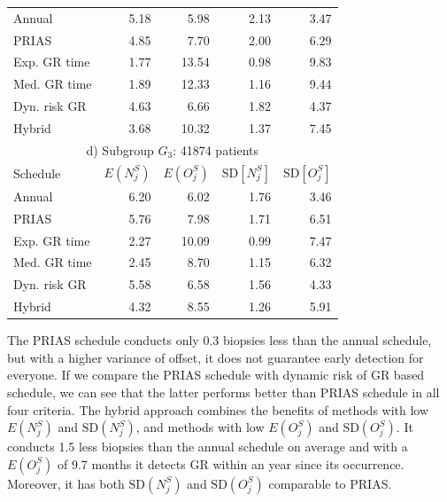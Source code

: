 \begin{table}
\begin{tabular}{lrrrr}
\hline
Annual         & 5.18            & 5.98                & 2.13          & 3.47              \\
PRIAS          & 4.85            & 7.70                & 2.00          & 6.29        \\
Exp. GR time & 1.77            & 13.54               & 0.98          & 9.83              \\
Med. GR time & 1.89             & 12.33               & 1.16          & 9.44              \\
Dyn. risk GR       & 4.63            & 6.66                & 1.82          & 4.37              \\
Hybrid       & 3.68            & 10.32                & 1.37          & 7.45              \\
\hline      
\multicolumn{5}{c}{d) Subgroup $G_3$: 41874 patients}\\
\hline
Schedule        & $E(N^S_j)$ & $E(O^S_j)$ & ${\mbox{SD}[N^S_j]}$ & ${\mbox{SD}[O^S_j]}$ \\
\hline
Annual         & 6.20             & 6.02                & 1.76          & 3.46              \\
PRIAS          & 5.76             & 7.98                & 1.71         & 6.51        \\
Exp. GR time & 2.27            & 10.09               & 0.99          & 7.47              \\
Med. GR time & 2.45            & 8.70                & 1.15          & 6.32              \\
Dyn. risk GR       & 5.58            & 6.58                & 1.56          & 4.33              \\
Hybrid       & 4.32            & 8.55                & 1.26          & 5.91              \\
\hline     
\end{tabular}
\end{table}

The PRIAS schedule conducts only 0.3 biopsies less than the annual schedule, but with a higher variance of offset, it does not guarantee early detection for everyone. If we compare the PRIAS schedule with dynamic risk of GR based schedule, we can see that the latter performs better than PRIAS schedule in all four criteria. The hybrid approach combines the benefits of methods with low $E(N^S_j)$ and $\mbox{SD}(N^S_j)$, and methods with low $E(O^S_j)$ and $\mbox{SD}(O^S_j)$. It conducts 1.5 less biopsies than the annual schedule on average and with a $E(O^S_j)$ of 9.7 months it detects GR within an year since its occurrence. Moreover, it has both $\mbox{SD}(N^S_j)$ and $\mbox{SD}(O^S_j)$ comparable to PRIAS.


